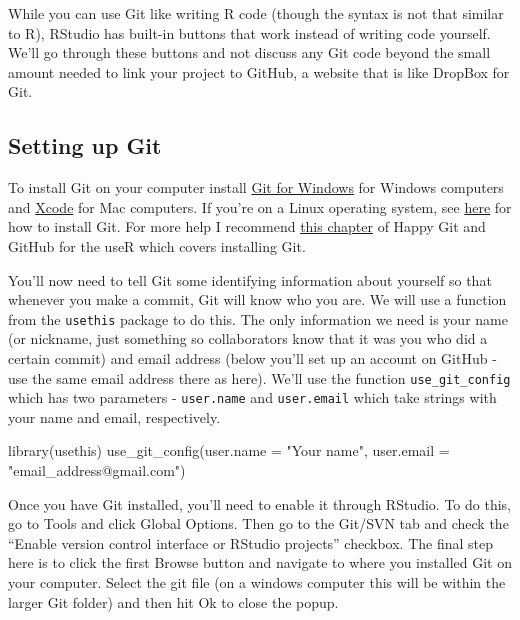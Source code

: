 \documentclass[
  12pt,
  openany]{book}
\newenvironment{Shaded}{\begin{snugshade}}{\end{snugshade}}
\newcommand{\AttributeTok}[1]{\textcolor[rgb]{0.61,0.61,0.61}{#1}}
\newcommand{\FunctionTok}[1]{\textcolor[rgb]{0,0,0}{#1}}
\newcommand{\NormalTok}[1]{#1}
\newcommand{\StringTok}[1]{\textcolor[rgb]{0.5,0.5,0.5}{#1}}
\begin{document}
While you can use Git like writing R code (though the syntax is not that similar to R), RStudio has built-in buttons that work instead of writing code yourself. We'll go through these buttons and not discuss any Git code beyond the small amount needed to link your project to GitHub, a website that is like DropBox for Git.

\hypertarget{setting-up-git}{%
\subsection{Setting up Git}\label{setting-up-git}}

To install Git on your computer install \href{https://gitforwindows.org/}{Git for Windows} for Windows computers and \href{https://git-scm.com/download/mac}{Xcode} for Mac computers. If you're on a Linux operating system, see \href{https://git-scm.com/download/linux}{here} for how to install Git. For more help I recommend \href{https://happygitwithr.com/install-git.html}{this chapter} of Happy Git and GitHub for the useR which covers installing Git.

You'll now need to tell Git some identifying information about yourself so that whenever you make a commit, Git will know who you are. We will use a function from the \texttt{usethis} package to do this. The only information we need is your name (or nickname, just something so collaborators know that it was you who did a certain commit) and email address (below you'll set up an account on GitHub - use the same email address there as here). We'll use the function \texttt{use\_git\_config} which has two parameters - \texttt{user.name} and \texttt{user.email} which take strings with your name and email, respectively.

\begin{Shaded}
\begin{Highlighting}[]
\FunctionTok{library}\NormalTok{(usethis)}
\FunctionTok{use\_git\_config}\NormalTok{(}\AttributeTok{user.name =} \StringTok{"Your name"}\NormalTok{, }\AttributeTok{user.email =} \StringTok{"email\_address@gmail.com"}\NormalTok{)}
\end{Highlighting}
\end{Shaded}

Once you have Git installed, you'll need to enable it through RStudio. To do this, go to Tools and click Global Options. Then go to the Git/SVN tab and check the ``Enable version control interface or RStudio projects'' checkbox. The final step here is to click the first Browse button and navigate to where you installed Git on your computer. Select the git file (on a windows computer this will be within the larger Git folder) and then hit Ok to close the popup.
\end{document}
